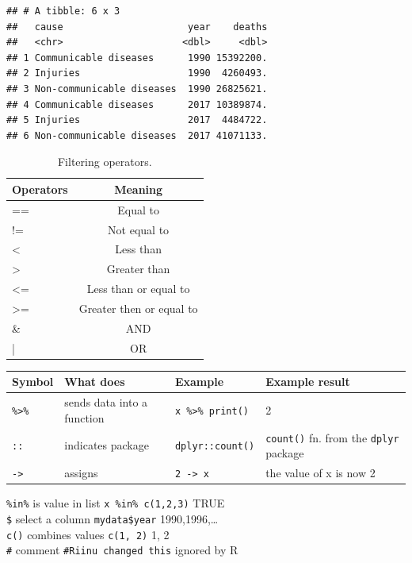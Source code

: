 \documentclass[12pt,]{krantz}
\theoremstyle{definition}
\theoremstyle{definition}
\theoremstyle{definition}
\theoremstyle{remark}
\begin{document}
\begin{verbatim}
## # A tibble: 6 x 3
##   cause                      year    deaths
##   <chr>                     <dbl>     <dbl>
## 1 Communicable diseases      1990 15392200.
## 2 Injuries                   1990  4260493.
## 3 Non-communicable diseases  1990 26825621.
## 4 Communicable diseases      2017 10389874.
## 5 Injuries                   2017  4484722.
## 6 Non-communicable diseases  2017 41071133.
\end{verbatim}

\begin{table}[t]

\caption{\label{tab:chap2-tab-filtering-operators}Filtering operators.}
\centering
\fontsize{8}{10}\selectfont
\begin{tabular}{lc}
\toprule
Operators & Meaning\\
\midrule
== & Equal to\\
!= & Not equal to\\
< & Less than\\
> & Greater than\\
<= & Less than or equal to\\
>= & Greater then or equal to\\
\& & AND\\
\addlinespace
| & OR\\
\bottomrule
\end{tabular}
\end{table}

\begin{longtable}[]{@{}llll@{}}
\toprule
Symbol & What does & Example & Example result\tabularnewline
\midrule
\endhead
\texttt{\%\textgreater{}\%} & sends data into a function &
\texttt{x\ \%\textgreater{}\%\ print()} & 2\tabularnewline
\texttt{::} & indicates package & \texttt{dplyr::count()} &
\texttt{count()} fn. from the \texttt{dplyr} package\tabularnewline
\texttt{-\textgreater{}} & assigns & \texttt{2\ -\textgreater{}\ x} &
the value of x is now 2\tabularnewline
\bottomrule
\end{longtable}

\texttt{\%in\%} \textbar{} is value in list \textbar{}
\texttt{x\ \%in\%\ c(1,2,3)} \textbar{} TRUE \textbar{}\\
\texttt{\$} \textbar{} select a column \textbar{} \texttt{mydata\$year}
\textbar{} 1990,1996,\ldots{}\textbar{}\\
\texttt{c()} \textbar{} combines values \textbar{} \texttt{c(1,\ 2)}
\textbar{} 1, 2 \textbar{}\\
\texttt{\#} \textbar{} comment\textbar{} \texttt{\#Riinu\ changed\ this}
\textbar{} ignored by R \textbar{}
\end{document}
